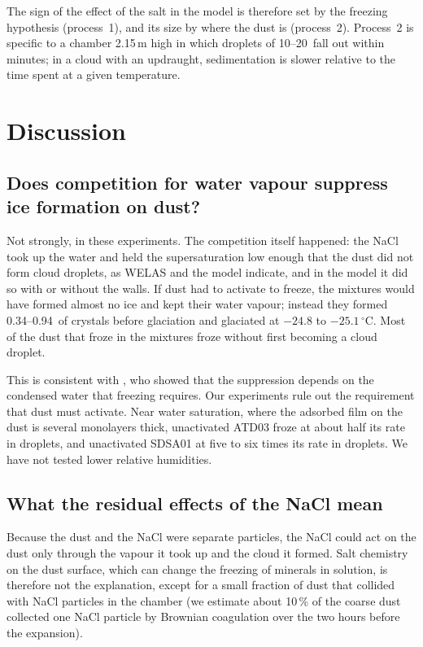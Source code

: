 The sign of the effect of the salt in the model is therefore set by the freezing hypothesis (process~1), and its size by where the dust is (process~2). Process~2 is specific to a chamber 2.15\,m high in which droplets of 10--20\um\ fall out within minutes; in a cloud with an updraught, sedimentation is slower relative to the time spent at a given temperature.

\section{Discussion}\label{sec:discussion}

\subsection{Does competition for water vapour suppress ice formation on dust?}

Not strongly, in these experiments. The competition itself happened: the NaCl took up the water and held the supersaturation low enough that the dust did not form cloud droplets, as WELAS and the model indicate, and in the model it did so with or without the walls. If dust had to activate to freeze, the mixtures would have formed almost no ice and kept their water vapour; instead they formed 0.34--0.94\cmc\ of crystals before glaciation and glaciated at $-24.8$ to $-25.1\,^\circ$C. Most of the dust that froze in the mixtures froze without first becoming a cloud droplet.

This is consistent with \citet{Simpson2018}, who showed that the suppression depends on the condensed water that freezing requires. Our experiments rule out the requirement that dust must activate. Near water saturation, where the adsorbed film on the dust is several monolayers thick, unactivated ATD03 froze at about half its rate in droplets, and unactivated SDSA01 at five to six times its rate in droplets. We have not tested lower relative humidities.

\subsection{What the residual effects of the NaCl mean}\label{sec:disc-residual}

Because the dust and the NaCl were separate particles, the NaCl could act on the dust only through the vapour it took up and the cloud it formed. Salt chemistry on the dust surface, which can change the freezing of minerals in solution, is therefore not the explanation, except for a small fraction of dust that collided with NaCl particles in the chamber (we estimate about 10\,\% of the coarse dust collected one NaCl particle by Brownian coagulation over the two hours before the expansion).

